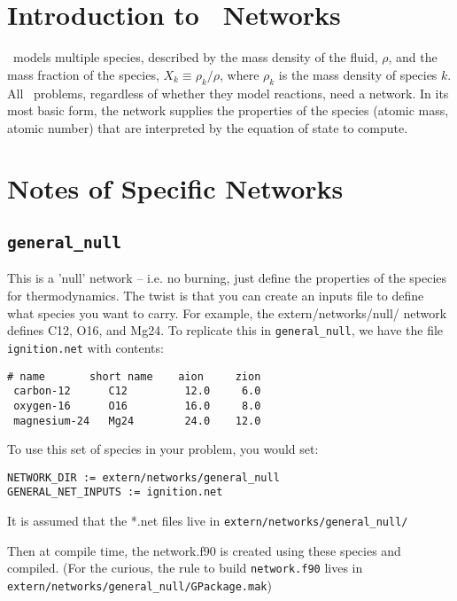 \section{Introduction to \maestro\ Networks}

\maestro\ models multiple species, described by the mass density of
the fluid, $\rho$, and the mass fraction of the species, $X_k \equiv
\rho_k/\rho$, where $\rho_k$ is the mass density of species $k$.  All
\maestro\ problems, regardless of whether they model reactions, need a
network.  In its most basic form, the network supplies the properties
of the species (atomic mass, atomic number) that are interpreted by
the equation of state to compute.

\section{Notes of Specific Networks}

\subsection{{\tt general\_null}}

This is a 'null' network -- i.e. no burning, just define the
properties of the species for thermodynamics.  The twist is that you
can create an inputs file to define what species you want to carry.
For example, the extern/networks/null/ network defines C12, O16, and
Mg24.  To replicate this in {\tt general\_null}, we have the file
{\tt ignition.net} with contents:

\begin{verbatim}
# name       short name    aion     zion
 carbon-12      C12         12.0     6.0
 oxygen-16      O16         16.0     8.0
 magnesium-24   Mg24        24.0    12.0
\end{verbatim}

To use this set of species in your problem, you would set:

\begin{verbatim}
NETWORK_DIR := extern/networks/general_null
GENERAL_NET_INPUTS := ignition.net
\end{verbatim}

It is assumed that the *.net files live in {\tt extern/networks/general\_null/}

Then at compile time, the network.f90 is created using these species and
compiled.  (For the curious, the rule to build {\tt network.f90} lives in
{\tt extern/networks/general\_null/GPackage.mak})


